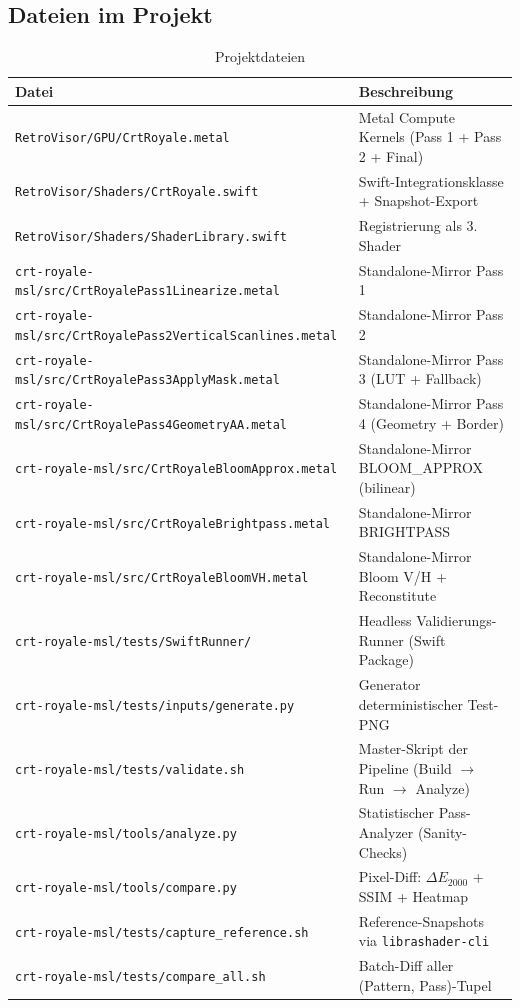 \documentclass[11pt, a4paper]{article}
\newcommand{\tableheadercolor}{\rowcolor{hkared}}
\newcommand{\thw}[1]{\color{white}\textbf{#1}}  %
\begin{document}
\subsection{Dateien im Projekt}
\vspace{.25cm}
\begin{table}[H]
\centering
\small
{}
\begin{tabularx}{\textwidth}{lX}
    \toprule
    \tableheadercolor \thw{Datei} & \thw{Beschreibung} \\
    \midrule
    \texttt{RetroVisor/GPU/CrtRoyale.metal} & Metal Compute Kernels (Pass 1 + Pass 2 + Final) \\
    \texttt{RetroVisor/Shaders/CrtRoyale.swift} & Swift-Integrationsklasse + Snapshot-Export \\
    \texttt{RetroVisor/Shaders/ShaderLibrary.swift} & Registrierung als 3. Shader \\
    \texttt{crt-royale-msl/src/CrtRoyalePass1Linearize.metal} & Standalone-Mirror Pass 1 \\
    \texttt{crt-royale-msl/src/CrtRoyalePass2VerticalScanlines.metal} & Standalone-Mirror Pass 2 \\
    \texttt{crt-royale-msl/src/CrtRoyalePass3ApplyMask.metal} & Standalone-Mirror Pass 3 (LUT + Fallback) \\
    \texttt{crt-royale-msl/src/CrtRoyalePass4GeometryAA.metal} & Standalone-Mirror Pass 4 (Geometry + Border) \\
    \texttt{crt-royale-msl/src/CrtRoyaleBloomApprox.metal} & Standalone-Mirror BLOOM\_APPROX (bilinear) \\
    \texttt{crt-royale-msl/src/CrtRoyaleBrightpass.metal} & Standalone-Mirror BRIGHTPASS \\
    \texttt{crt-royale-msl/src/CrtRoyaleBloomVH.metal} & Standalone-Mirror Bloom V/H + Reconstitute \\
    \texttt{crt-royale-msl/tests/SwiftRunner/} & Headless Validierungs-Runner (Swift Package) \\
    \texttt{crt-royale-msl/tests/inputs/generate.py} & Generator deterministischer Test-PNG \\
    \texttt{crt-royale-msl/tests/validate.sh} & Master-Skript der Pipeline (Build $\rightarrow$ Run $\rightarrow$ Analyze) \\
    \texttt{crt-royale-msl/tools/analyze.py} & Statistischer Pass-Analyzer (Sanity-Checks) \\
    \texttt{crt-royale-msl/tools/compare.py} & Pixel-Diff: $\Delta E_{2000}$ + SSIM + Heatmap \\
    \texttt{crt-royale-msl/tests/capture\_reference.sh} & Reference-Snapshots via \texttt{librashader-cli} \\
    \texttt{crt-royale-msl/tests/compare\_all.sh} & Batch-Diff aller (Pattern, Pass)-Tupel \\
    \bottomrule
\end{tabularx}
 \vspace{.25cm}
\caption{Projektdateien}
\end{table}
\vspace{.25cm}
\end{document}
